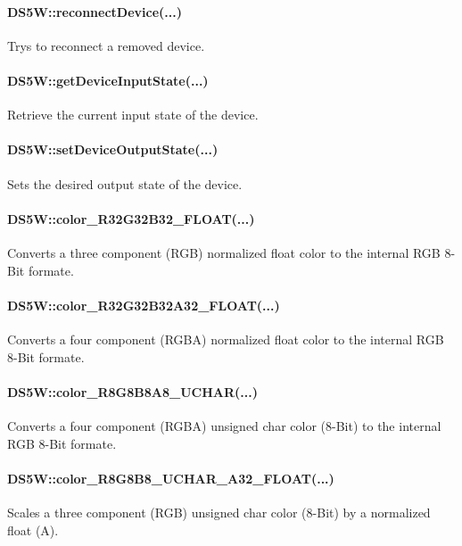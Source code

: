 \paragraph{DS5W::reconnectDevice(...)}
Trys to reconnect a removed device.\\


\paragraph{DS5W::getDeviceInputState(...)}
Retrieve the current input state of the device.\\


\paragraph{DS5W::setDeviceOutputState(...)}
Sets the desired output state of the device.\\


\paragraph{DS5W::color\_R32G32B32\_FLOAT(...)} 
Converts a three component (RGB) normalized float color to the internal RGB 8-Bit formate.\\


\paragraph{DS5W::color\_R32G32B32A32\_FLOAT(...)}
Converts a four component (RGBA) normalized float color to the internal RGB 8-Bit formate.\\


\paragraph{DS5W::color\_R8G8B8A8\_UCHAR(...)}
Converts a four component (RGBA) unsigned char color (8-Bit) to the internal RGB 8-Bit formate.\\


\paragraph{DS5W::color\_R8G8B8\_UCHAR\_A32\_FLOAT(...)}
Scales a three component (RGB) unsigned char color (8-Bit) by a normalized float (A).\\



\newpage